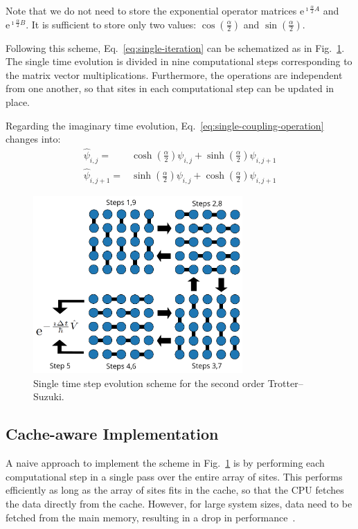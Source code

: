 Note that we do not need to store the exponential operator matrices $\mathrm{e}^{\imath \frac{\alpha}{2} A}$ and $\mathrm{e}^{\imath \frac{\alpha}{2} B}$. It is sufficient to store only two values: $ \cos\left(\frac{\alpha}{2}\right)$ and $\sin\left(\frac{\alpha}{2}\right)$.

Following this scheme, Eq.~\eqref{eq:single-iteration} can be schematized as in Fig.~\ref{fig:scheme-iteration}. The single time evolution is divided in nine computational steps corresponding to the matrix vector multiplications. Furthermore, the operations are independent from one another, so that sites in each computational step can be updated in place.

Regarding the imaginary time evolution, Eq.~\eqref{eq:single-coupling-operation} changes into:
\begin{align} \label{eq:single-coupling-operation-imag}
\hat{\psi}_{i,j} = & \cosh\left(\frac{\alpha}{2}\right) \psi_{i,j} + \sinh\left(\frac{\alpha}{2}\right) \psi_{i,j+1} \nonumber \\ 
\hat{\psi}_{i,j+1} = & \sinh\left(\frac{\alpha}{2}\right) \psi_{i,j} + \cosh\left(\frac{\alpha}{2}\right) \psi_{i,j+1} 
\end{align}
\begin{figure} 
   \centering
   \includegraphics[width=8cm]{Figs/Single_time_step_evolution.pdf}
   \caption{Single time step evolution scheme for the second order Trotter--Suzuki.} \label{fig:scheme-iteration}
\end{figure}

\subsection{Cache-aware Implementation}
A naive approach to implement the scheme in Fig.~\ref{fig:scheme-iteration} is by performing each computational step in a single pass over the entire array of sites. This performs efficiently as long as the array of sites fits in the cache, so that the CPU fetches the data directly from the cache. However, for large system sizes, data need to be fetched from the main memory, resulting in a drop in performance~\citep{bederian2011boosting}. 


